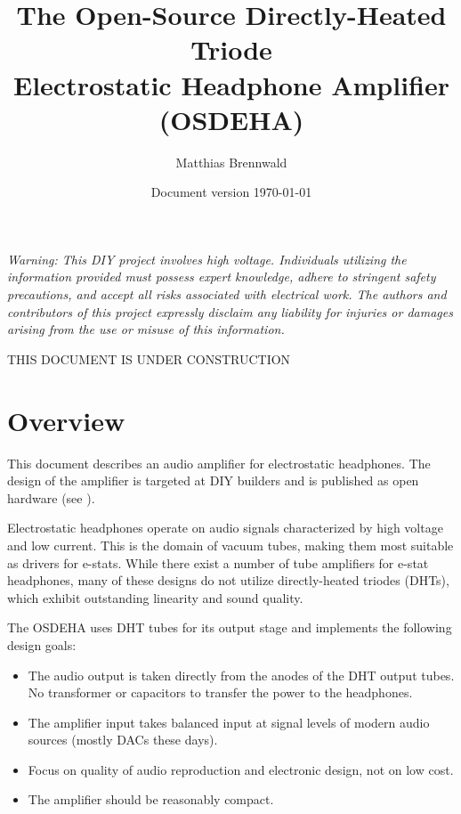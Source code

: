 





\title{The Open-Source Directly-Heated Triode \\ Electrostatic Headphone Amplifier \\ (OSDEHA)}
\author{Matthias Brennwald}
\date{Document version \today}




\maketitle

\emph{Warning: This DIY project involves high voltage. Individuals utilizing the information provided must possess expert knowledge, adhere to stringent safety precautions, and accept all risks associated with electrical work. The authors and contributors of this project expressly disclaim any liability for injuries or damages arising from the use or misuse of this information.}


THIS DOCUMENT IS UNDER CONSTRUCTION


\section{Overview}

This document describes an audio amplifier for electrostatic headphones. The design of the amplifier is targeted at DIY builders and is published as open hardware (see ).

Electrostatic headphones operate on audio signals characterized by high voltage and low current. This is the domain of vacuum tubes, making them most suitable as drivers for e-stats.  While there exist a number of tube amplifiers for e-stat headphones, many of these designs do not utilize directly-heated triodes (DHTs), which exhibit outstanding linearity and sound quality.\par

The OSDEHA uses DHT tubes for its output stage and implements the following design goals:
\begin{itemize}
\item The audio output is taken directly from the anodes of the DHT output tubes. No transformer or capacitors to transfer the power to the headphones.
\item The amplifier input takes balanced input at signal levels of modern audio sources (mostly DACs these days).
\item Focus on quality of audio reproduction and electronic design, not on low cost.
\item The amplifier should be reasonably compact.
\end{itemize}



